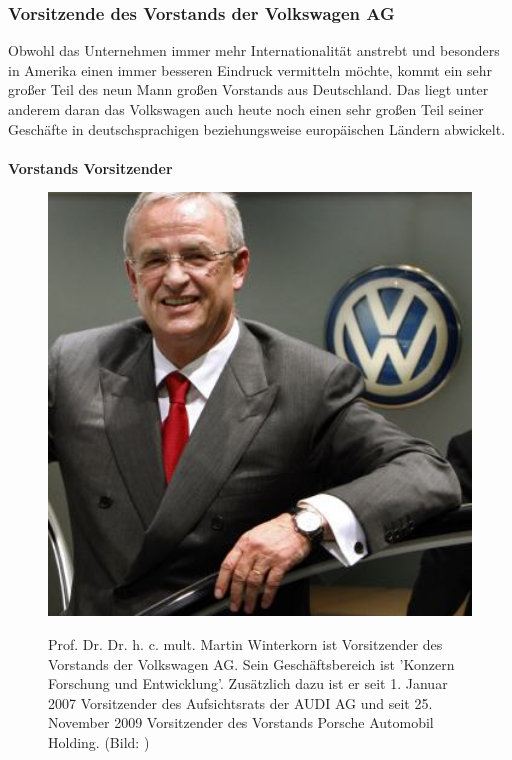 \documentclass[12pt]{article}
\begin{document}
\subsubsection{Vorsitzende des Vorstands der Volkswagen AG}
Obwohl das Unternehmen immer mehr Internationalität anstrebt und besonders in Amerika einen immer besseren Eindruck vermitteln möchte, kommt ein sehr großer Teil des neun Mann großen Vorstands aus Deutschland. Das liegt unter anderem daran das Volkswagen auch heute noch einen sehr großen Teil seiner Geschäfte in deutschsprachigen beziehungsweise europäischen Ländern abwickelt.\cite{vorstand} \\ \\
\textbf{Vorstands Vorsitzender}
\begin{figure}[!h]
	\centering
	\begin{minipage}[h]{0.20\textwidth}
		\centering
		\includegraphics[width=1.0\textwidth]{images/MartinWinterkorn.jpg}
		\label{fig:vorstandvw0}
	\end{minipage}
		\begin{minipage}[h]{0.10\textwidth}
		\hspace{1cm} 
	\end{minipage}
	\begin{minipage}[h]{0.65\textwidth}
		Prof. Dr. Dr. h. c. mult. Martin Winterkorn ist Vorsitzender des Vorstands der Volkswagen AG. Sein Geschäftsbereich ist 'Konzern Forschung und Entwicklung'. Zusätzlich dazu ist er seit 1. Januar 2007 Vorsitzender des Aufsichtsrats der AUDI AG und seit 25. November 2009 Vorsitzender des Vorstands Porsche Automobil Holding. 		(Bild: \cite{mwpic} )

	\end{minipage}
\end{figure}\FloatBarrier\noindent
\end{document}

